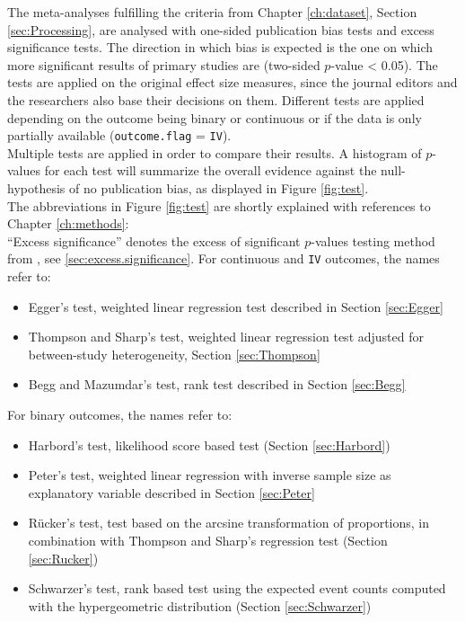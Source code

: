 \documentclass[11pt,a4paper,twoside]{book}\usepackage[]{graphicx}\usepackage[]{color}
\begin{document}
The meta-analyses fulfilling the criteria from Chapter \ref{ch:dataset}, Section \ref{sec:Processing}, are analysed with one-sided publication bias tests and excess significance tests. The direction in which bias is expected is the one on which more significant results of primary studies are (two-sided $p$-value < 0.05). The tests are applied on the original effect size measures, since the journal editors and the researchers also base their decisions on them. Different tests are applied depending on the outcome being binary or continuous or if the data is only partially available (\texttt{outcome.flag} = \texttt{IV}).\\
Multiple tests are applied in order to compare their results. A histogram of $p$-values for each test will summarize the overall evidence against the null-hypothesis of no publication bias, as displayed in Figure \ref{fig:test}.\\
The abbreviations in Figure \ref{fig:test}  are shortly explained with references to Chapter \ref{ch:methods}: \\
``Excess significance'' denotes the excess of significant $p$-values testing method from \citet{excess.significance}, see \ref{sec:excess.significance}. For continuous and \texttt{IV} outcomes, the names refer to: 

\begin{itemize}
\item Egger's test, weighted linear regression test described in Section \ref{sec:Egger}
\item Thompson and Sharp's test, weighted linear regression test adjusted for between-study heterogeneity, Section \ref{sec:Thompson}
\item Begg and Mazumdar's test, rank test described in Section \ref{sec:Begg}
\end{itemize}

For binary outcomes, the names refer to:
\begin{itemize}
\item Harbord's test, likelihood score based test (Section \ref{sec:Harbord})
\item Peter's test, weighted linear regression with inverse sample size as explanatory variable described in Section \ref{sec:Peter}
\item R\"ucker's test, test based on the arcsine transformation of proportions, in combination with Thompson and Sharp's regression test (Section \ref{sec:Rucker})
\item Schwarzer's test, rank based test using the expected event counts computed with the hypergeometric distribution (Section \ref{sec:Schwarzer})
\end{itemize}
\end{document}
